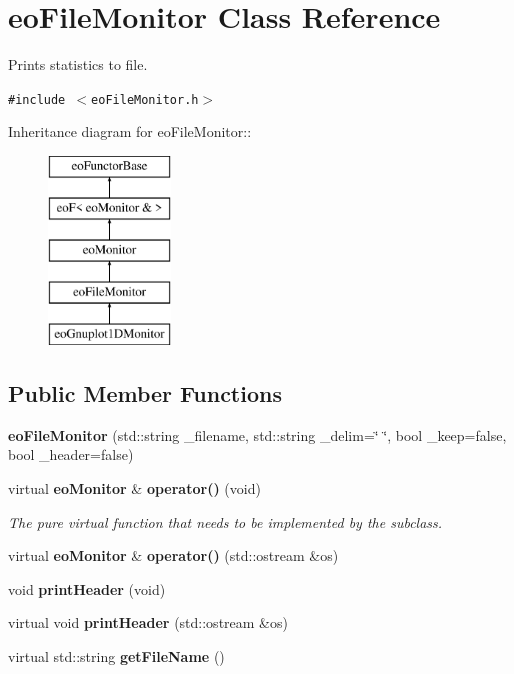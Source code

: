 \section{eo\-File\-Monitor Class Reference}
\label{classeo_file_monitor}
Prints statistics to file.  


{\tt \#include $<$eo\-File\-Monitor.h$>$}

Inheritance diagram for eo\-File\-Monitor::\begin{figure}[H]
\begin{center}
\leavevmode
\includegraphics[height=5cm]{classeo_file_monitor}
\end{center}
\end{figure}
\subsection*{Public Member Functions}
\begin{CompactItemize}
\item 
{\bf eo\-File\-Monitor} (std::string \_\-filename, std::string \_\-delim=\char`\"{} \char`\"{}, bool \_\-keep=false, bool \_\-header=false)\label{classeo_file_monitor_a0}

\item 
virtual {\bf eo\-Monitor} \& {\bf operator()} (void)\label{classeo_file_monitor_a1}

\begin{CompactList}\small\item\em The pure virtual function that needs to be implemented by the subclass. \item\end{CompactList}\item 
virtual {\bf eo\-Monitor} \& {\bf operator()} (std::ostream \&os)\label{classeo_file_monitor_a2}

\item 
void {\bf print\-Header} (void)\label{classeo_file_monitor_a3}

\item 
virtual void {\bf print\-Header} (std::ostream \&os)\label{classeo_file_monitor_a4}

\item 
virtual std::string {\bf get\-File\-Name} ()\label{classeo_file_monitor_a5}

\end{CompactItemize}
